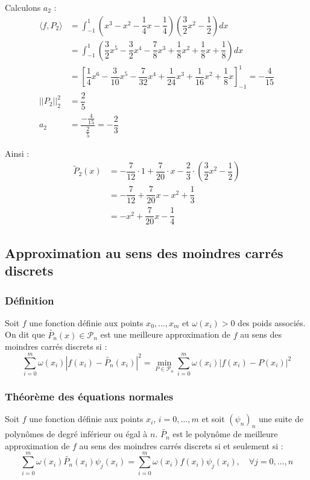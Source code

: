 Calculons $a_2$ :
\begin{align*}
\langle f,P_2\rangle &= \displaystyle\int_{-1}^1 \left(x^3-x^2-\dfrac{1}{4}x-\dfrac{1}{4}\right)\left(\dfrac{3}{2}x^2-\dfrac{1}{2}\right)dx \\
&= \displaystyle\int_{-1}^1 \left(\dfrac{3}{2}x^5-\dfrac{3}{2}x^4-\dfrac{7}{8}x^3+\dfrac{1}{8}x^2+\dfrac{1}{8}x+\dfrac{1}{8}\right)dx \\
&= \left[\dfrac{1}{4}x^6-\dfrac{3}{10}x^5-\dfrac{7}{32}x^4+\dfrac{1}{24}x^3+\dfrac{1}{16}x^2+\dfrac{1}{8}x\right]_{-1}^1 = -\dfrac{4}{15} \\
||P_2||_2^2 &= \dfrac{2}{5} \\
a_2 &= \dfrac{-\frac{4}{15}}{\frac{2}{5}} = -\dfrac{2}{3}
\end{align*}

Ainsi :
\begin{align*}
\tilde{P}_2(x) &= -\dfrac{7}{12} \cdot 1 + \dfrac{7}{20} \cdot x - \dfrac{2}{3} \cdot \left(\dfrac{3}{2}x^2-\dfrac{1}{2}\right) \\
&= -\dfrac{7}{12} + \dfrac{7}{20}x - x^2 + \dfrac{1}{3} \\
&= -x^2 + \dfrac{7}{20}x - \dfrac{1}{4}
\end{align*}

\subsection{Approximation au sens des moindres carrés discrets}
\subsubsection*{Définition}
Soit $f$ une fonction définie aux points $x_0,\ldots,x_m$ et $\omega(x_i) > 0$ des poids associés. On dit que $\tilde{P_n}(x)\in \mathcal{P}_n$ est une meilleure approximation de $f$ au sens des moindres carrés discrets si :
$$\displaystyle\sum_{i=0}^{m}\omega(x_i)|f(x_i)-\tilde{P_n}(x_i)|^2 = \min_{P\in \mathcal{P}_n} \displaystyle\sum_{i=0}^{m}\omega(x_i)|f(x_i)-P(x_i)|^2$$

\subsubsection*{Théorème des équations normales}
Soit $f$ une fonction définie aux points $x_i$, $i=0,\ldots,m$ et soit $(\psi_n)_n$ une suite de polynômes de degré inférieur ou égal à $n$. $\tilde{P_n}$ est le polynôme de meilleure approximation de $f$ au sens des moindres carrés discrets si et seulement si :
$$\displaystyle\sum_{i=0}^{m}\omega(x_i)\tilde{P_n}(x_i)\psi_j(x_i)=\displaystyle\sum_{i=0}^{m}\omega(x_i)f(x_i)\psi_j(x_i), \quad \forall j=0,\ldots,n$$

